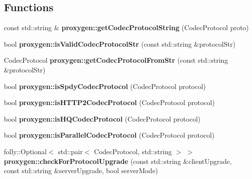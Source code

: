 \subsection*{Functions}
\begin{DoxyCompactItemize}
\item 
const std\+::string \& {\bf proxygen\+::get\+Codec\+Protocol\+String} (Codec\+Protocol proto)
\item 
bool {\bf proxygen\+::is\+Valid\+Codec\+Protocol\+Str} (const std\+::string \&protocol\+Str)
\item 
Codec\+Protocol {\bf proxygen\+::get\+Codec\+Protocol\+From\+Str} (const std\+::string \&protocol\+Str)
\item 
bool {\bf proxygen\+::is\+Spdy\+Codec\+Protocol} (Codec\+Protocol protocol)
\item 
bool {\bf proxygen\+::is\+H\+T\+T\+P2\+Codec\+Protocol} (Codec\+Protocol protocol)
\item 
bool {\bf proxygen\+::is\+H\+Q\+Codec\+Protocol} (Codec\+Protocol protocol)
\item 
bool {\bf proxygen\+::is\+Parallel\+Codec\+Protocol} (Codec\+Protocol protocol)
\item 
folly\+::\+Optional$<$ std\+::pair$<$ Codec\+Protocol, std\+::string $>$ $>$ {\bf proxygen\+::check\+For\+Protocol\+Upgrade} (const std\+::string \&client\+Upgrade, const std\+::string \&server\+Upgrade, bool server\+Mode)
\end{DoxyCompactItemize}

